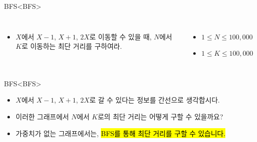 \begin{frame}{BFS}{<BFS>}
  \begin{center}
  \end{center}
  \vspace{4mm}
  \begin{columns}[T]
      \begin{itemize}
        \item $X$에서 $X{-}1$, $X{+}1$, $2X$로 이동할 수 있을 때, $N$에서 $K$로
          이동하는 최단 거리를 구하여라.
      \end{itemize}
      \begin{itemize}
        \item $1 \le N \le 100{,}000$
        \item $1 \le K \le 100{,}000$
      \end{itemize}
  \end{columns}
\end{frame}

\begin{frame}{BFS}{<BFS>}
  \begin{center}
  \end{center}
  \vspace{6mm}
  \begin{itemize}
    \item $X$에서 $X{-}1$, $X{+}1$, $2X$로 갈 수 있다는 정보를 \alert{간선}으로 생각합시다.
    \item 이러한 그래프에서 $N$에서 $K$로의 최단 거리는 어떻게 구할 수 있을까요?
    \item 가중치가 없는 그래프에서는, \hl{BFS를 통해 최단 거리를 구할 수 있습니다.}
  \end{itemize}
\end{frame}

